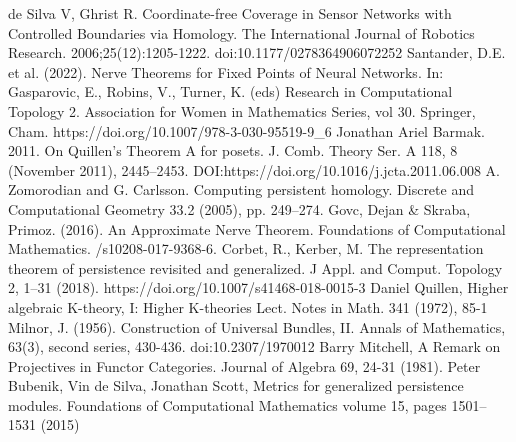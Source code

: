 \documentclass[english,12pt]{article}
\numberwithin{equation}{section}
\theoremstyle{definition}
\theoremstyle{remark}
\begin{document}
\begin{thebibliography}{99}
  de Silva V, Ghrist R.
  \newblock Coordinate-free Coverage in Sensor Networks with Controlled Boundaries via Homology.
  \newblock The International Journal of Robotics Research. 2006;25(12):1205-1222.
  \newblock doi:10.1177/0278364906072252
  Santander, D.E. et al. (2022). 
  \newblock Nerve Theorems for Fixed Points of Neural Networks.
  \newblock In: Gasparovic, E., Robins, V., Turner, K. (eds)
  \newblock Research in Computational Topology 2. Association for Women in Mathematics Series, vol 30. Springer, Cham.
  \newblock https://doi.org/10.1007/978-3-030-95519-9\_6
  Jonathan Ariel Barmak. 2011.
  \newblock On Quillen’s Theorem A for posets.
  \newblock J. Comb. Theory Ser. A 118, 8 (November 2011), 2445–2453.
  \newblock DOI:https://doi.org/10.1016/j.jcta.2011.06.008
  A. Zomorodian and G. Carlsson.
  \newblock Computing persistent homology.
  \newblock Discrete and Computational Geometry 33.2 (2005), pp. 249–274.
  Govc, Dejan \& Skraba, Primoz. (2016).
  \newblock An Approximate Nerve Theorem.
  \newblock Foundations of Computational Mathematics.
  /s10208-017-9368-6.
  Corbet, R., Kerber, M.
  \newblock The representation theorem of persistence revisited and generalized.
  \newblock J Appl. and Comput. Topology 2, 1–31 (2018).
  \newblock https://doi.org/10.1007/s41468-018-0015-3
  Daniel Quillen,
  \newblock Higher algebraic K-theory, I: Higher K-theories Lect.
  \newblock Notes in Math. 341 (1972), 85-1
  Milnor, J. (1956).
  \newblock Construction of Universal Bundles, II.
  \newblock Annals of Mathematics, 63(3), second series, 430-436.
  \newblock doi:10.2307/1970012
  Barry Mitchell,
  \newblock A Remark on Projectives in Functor Categories.
  \newblock Journal of Algebra 69, 24-31 (1981).
  Peter Bubenik, Vin de Silva, Jonathan Scott,
  \newblock Metrics for generalized persistence modules.
  \newblock Foundations of Computational Mathematics volume 15, pages 1501–1531 (2015)
\end{thebibliography}
\end{document}
